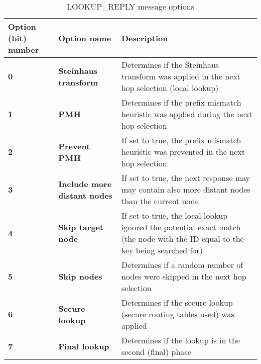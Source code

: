 \begin{table}[H]
\scriptsize
\begin{center}
\begin{tabular}{p{2.7cm} p{3.3cm} p{8.5cm}}
	\hline
	\textbf{Option (bit) number}			& \textbf{Option name}					& \textbf{Description}				\\[1mm]
    \hline
	\textbf{0}								& \textbf{Steinhaus transform}			& Determines if the Steinhaus transform was applied	in the next hop selection (local lookup)			\\[1.5mm]
    \textbf{1}								& \textbf{PMH}							& Determines if the prefix mismatch heuristic was applied during the next hop selection					\\[1.5mm]
	\textbf{2}								& \textbf{Prevent PMH}					& If set to true, the prefix mismatch heuristic was prevented in the next hop selection					\\[1.5mm]
	\textbf{3}								& \textbf{Include more distant nodes}	& If set to true, the next response may may contain also more distant nodes than the current node		\\[1.5mm]
	\textbf{4}								& \textbf{Skip target node}				& If set to true, the local lookup ignored the potential exact match (the node with the ID equal to the key being searched for)		\\[1.5mm]
	\textbf{5}								& \textbf{Skip nodes}					& Determines if a random number of nodes were skipped in the next hop selection							\\[1.5mm]
	\textbf{6}								& \textbf{Secure lookup}				& Determines if the secure lookup (secure routing tables used) was applied								\\[1.5mm]
	\textbf{7}								& \textbf{Final lookup}					& Determines if the lookup is in the second (final) phase												\\[1.5mm]	
    \hline
\end{tabular}
\end{center}
\caption{LOOKUP\_REPLY message options}
\label{tab:mLookupReplyOptions}
\end{table}





